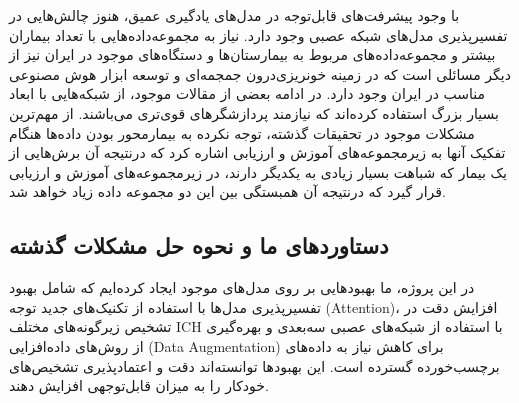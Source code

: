  
 
 
 با وجود پیشرفت‌های قابل‌توجه در مدل‌های یادگیری عمیق، هنوز چالش‌هایی در تفسیرپذیری مدل‌های شبکه عصبی وجود دارد. نیاز به مجموعه‌داده‌هایی با تعداد بیماران بیشتر و مجموعه‌داده‌های مربوط به بیمارستان‌ها و دستگاه‌های موجود در ایران نیز از دیگر مسائلی است که در زمینه خونریزی‌درون جمجمه‌ای و توسعه ابزار هوش مصنوعی مناسب در ایران وجود دارد. در ادامه بعضی از مقالات موجود، از شبکه‌هایی با ابعاد بسیار بزرگ استفاده کرده‌اند که نیازمند پردازشگر‌های قوی‌تری می‌باشند. از مهم‌ترین مشکلات موجود در تحقیقات گذشته، توجه نکرده به بیمارمحور بودن داده‌ها هنگام تفکیک آنها به زیرمجموعه‌های آموزش و ارزیابی اشاره کرد که درنتیجه‌ آن برش‌هایی از یک بیمار که شباهت بسیار زیادی به یکدیگر دارند، در زیرمجموعه‌های آموزش و ارزیابی قرار گیرد که درنتیجه آن همبستگی بین این دو مجموعه داده زیاد خواهد شد.
 
 \subsection*{دستاوردهای ما و نحوه حل مشکلات گذشته}
 
 در این پروژه، ما بهبودهایی بر روی مدل‌های موجود ایجاد کرده‌ایم که شامل بهبود تفسیرپذیری مدل‌ها با استفاده از تکنیک‌های جدید توجه (Attention)، افزایش دقت در تشخیص زیرگونه‌های مختلف ICH با استفاده از شبکه‌های عصبی سه‌بعدی و بهره‌گیری از روش‌های داده‌افزایی (Data Augmentation) برای کاهش نیاز به داده‌های برچسب‌خورده گسترده است. این بهبودها توانسته‌اند دقت و اعتمادپذیری تشخیص‌های خودکار را به میزان قابل‌توجهی افزایش دهند.
 
